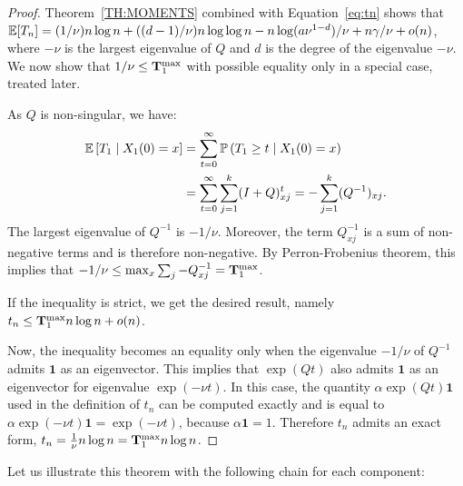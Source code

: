 \documentclass{aptpub}
\newcommand\expect[1]{\mathchoice{\bexpect{#1}}{\sexpect{#1}}{\sexpect{#1}}{\sexpect{#1}}}
\newcommand\bexpect[1]{\mathbb{E}\left[#1\right]}
\newcommand\sexpect[1]{\mathbb{E}[#1]}
\newcommand\proba[1]{\mathchoice{\bproba{#1}}{\sproba{#1}}{\sproba{#1}}{\sproba{#1}}}
\newcommand\bproba[1]{\mathbb{P}\left(#1\right)}
\newcommand\sproba[1]{\mathbb{P}(#1)}
\begin{document}
\begin{proof}
  Theorem~\ref{TH:MOMENTS} combined with Equation~\eqref{eq:tn}
  shows that
  $\expect{T_n}=(1/\nu)n\log n + ((d-1)/\nu) n \log \log n -
  n\log(a\nu^{1-d})/\nu + n\gamma/\nu + o(n)$,
  where $-\nu$ is the largest eigenvalue of $Q$ and $d$ is the degree
  of the eigenvalue $-\nu$. We now show that
  $1/\nu\le {\bf T}^{\max}_1$ with possible equality only in a special case, treated later.

  As $Q$ is non-singular, we have: 
  \begin{align*}
    \expect{T_1 \mid X_1(0)=x} %
    &= \sum_{t=0}^\infty \proba{T_1\ge t\mid X_1(0)=x}\\
    &=\sum_{t=0}^\infty \sum_{j=1}^k(I+Q)^t_{xj} =
      -\sum_{j=1}^k(Q^{-1})_{xj}. 
  \end{align*}
  The largest eigenvalue of $Q^{-1}$ is $-1/\nu$. Moreover, the term
  $Q^{-1}_{xj}$ is a sum of non-negative terms and is therefore
  non-negative. By Perron-Frobenius theorem, this implies that
  $-1/\nu\le \max_{x} \sum_j -Q^{-1}_{xj} = {\bf T}_1^{\max}$.

If the inequality is strict, we get the desired result, namely  $t_n \le {\bf T}_1^{\max} n \log n + o(n)$.

Now, the inequality becomes  an equality only when the eigenvalue  $-1/\nu$ of    $Q^{-1}$ admits $\mathbf{1}$ as an eigenvector.
This implies that $\exp(Qt)$ also admits  $\mathbf{1}$ as an eigenvector for eigenvalue $\exp(-\nu t)$.
In this case,  the quantity $ \alpha \exp(Qt)\mathbf{1}$ used in the definition of $t_n$  can be computed exactly and is equal to  $\alpha \exp(-\nu t)\mathbf{1} =  \exp(-\nu t)$, because $\alpha \mathbf{1} = 1$.
Therefore $t_n$ admits an exact form,  $  t_n = \frac{1}{\nu} n \log n =  {\bf T}_1^{\max} n \log n$.



  
\end{proof}

Let us illustrate this theorem with the following chain for each
component:
\end{document}
